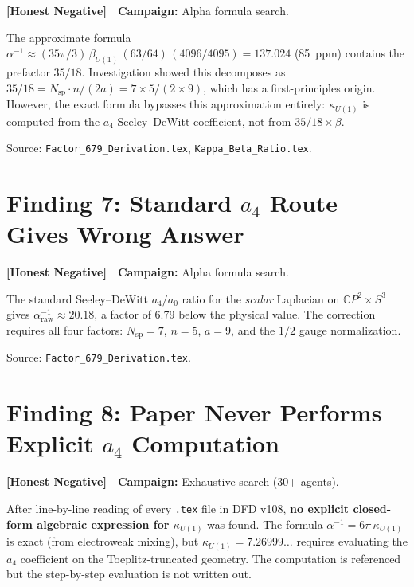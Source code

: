 \documentclass[11pt,a4paper]{article}
\newcommand{\honest}{\textcolor{honest}{\textbf{[Honest Negative]}}}
\newcommand{\CP}{\mathbb{C}P}
\begin{document}
\honest\ \ \textbf{Campaign:} Alpha formula search.

The approximate formula $\alpha^{-1} \approx (35\pi/3)\,\beta_{U(1)}
\,(63/64)\,(4096/4095) = 137.024$ (85~ppm) contains the prefactor $35/18$.
Investigation showed this decomposes as
$35/18 = N_{\mathrm{sp}} \cdot n/(2a) = 7 \times 5/(2 \times 9)$,
which has a first-principles origin.
However, the exact formula bypasses this approximation entirely:
$\kappa_{U(1)}$ is computed from the $a_4$ Seeley--DeWitt coefficient,
not from $35/18 \times \beta$.

Source: \texttt{Factor\_679\_Derivation.tex}, \texttt{Kappa\_Beta\_Ratio.tex}.


\section{Finding 7: Standard $a_4$ Route Gives Wrong Answer}
\label{sec:a4-wrong}

\honest\ \ \textbf{Campaign:} Alpha formula search.

The standard Seeley--DeWitt $a_4/a_0$ ratio for the \emph{scalar} Laplacian
on $\CP^2 \times S^3$ gives $\alpha^{-1}_{\mathrm{raw}} \approx 20.18$,
a factor of 6.79 below the physical value. The correction requires all
four factors: $N_{\mathrm{sp}} = 7$, $n = 5$, $a = 9$, and the $1/2$
gauge normalization.

Source: \texttt{Factor\_679\_Derivation.tex}.


\section{Finding 8: Paper Never Performs Explicit $a_4$ Computation}
\label{sec:a4-gap}

\honest\ \ \textbf{Campaign:} Exhaustive search (30+ agents).

After line-by-line reading of every \texttt{.tex} file in DFD v108,
\textbf{no explicit closed-form algebraic expression for $\kappa_{U(1)}$}
was found. The formula $\alpha^{-1} = 6\pi\,\kappa_{U(1)}$ is exact
(from electroweak mixing), but $\kappa_{U(1)} = 7.26999\ldots$ requires
evaluating the $a_4$ coefficient on the Toeplitz-truncated geometry.
The computation is referenced but the step-by-step evaluation is not
written out.
\end{document}
